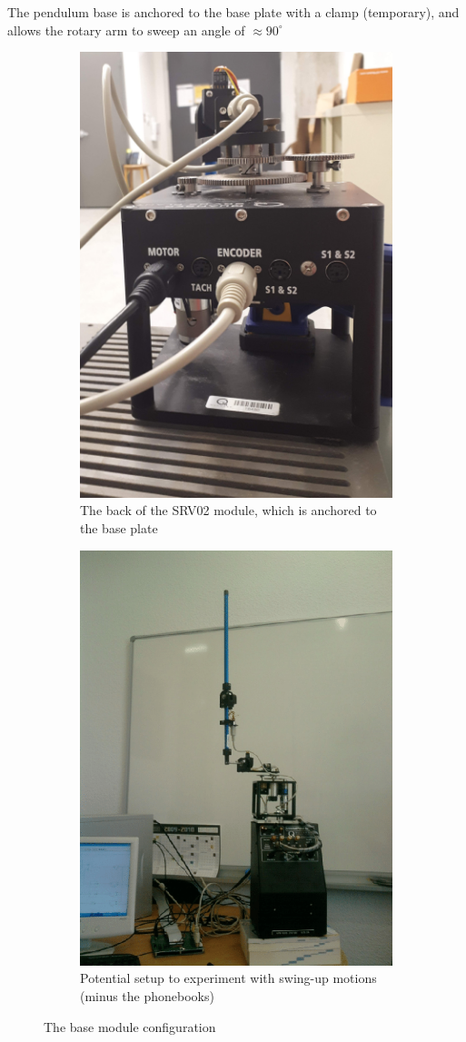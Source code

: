\documentclass[12pt,letterpaper]{article}
\begin{document}
The pendulum base is anchored to the base plate with a clamp (temporary), and allows the rotary arm to sweep an angle of $\approx 90^{\circ}$

\begin{figure}[H]
\centering
\begin{subfigure}[b]{.4\textwidth}
    \centering
    \includegraphics[width=0.7\linewidth]{img/srv02.jpg}
    \caption{The back of the SRV02 module, which is anchored to the base plate}
\end{subfigure}
%
\begin{subfigure}[b]{.45\textwidth}
    \centering
    \includegraphics[width=0.7\linewidth]{img/base_alt.png}
    \caption{Potential setup to experiment with swing-up motions (minus the phonebooks)}
\end{subfigure}

\caption{The base module configuration}
\label{fig:srv}
\end{figure}
\end{document}
